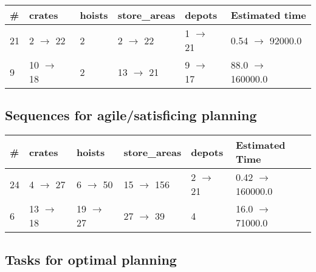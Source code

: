\documentclass{article}
\begin{document}
                            \begin{center}
                            \begin{tabular}{@{}l|l|l|l|l|l@{}}
                            \# & crates & hoists & store\_areas & depots & Estimated time\\\midrule
                            21&2 $\rightarrow$ 22&2&2 $\rightarrow$ 22&1 $\rightarrow$ 21&0.54 $\rightarrow$ 92000.0\\
9&10 $\rightarrow$ 18&2&13 $\rightarrow$ 21&9 $\rightarrow$ 17&88.0 $\rightarrow$ 160000.0
                            \end{tabular}
                            \end{center}
                    
                         \subsection*{Sequences for agile/satisficing planning}

                        \begin{center}
                        \begin{tabular}{@{}l|l|l|l|l|l@{}}
                        \# & crates & hoists & store\_areas & depots & Estimated Time\\\midrule
                        24&4 $\rightarrow$ 27&6 $\rightarrow$ 50&15 $\rightarrow$ 156&2 $\rightarrow$ 21&0.42 $\rightarrow$ 160000.0\\
6&13 $\rightarrow$ 18&19 $\rightarrow$ 27&27 $\rightarrow$ 39&4&16.0 $\rightarrow$ 71000.0
                        \end{tabular}
                        \end{center}
                    
                                \subsection*{Tasks for optimal planning}
                                
\end{document}
